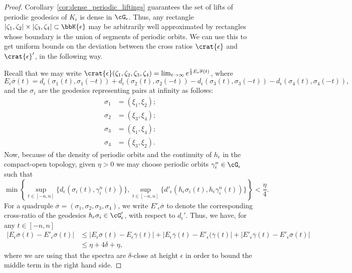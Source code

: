 \documentclass[reqno,11pt]{amsart}
\begin{document}
\begin{proof}
\par Corollary~\ref{cor:dense_periodic_liftings} guarantees the set of lifts of periodic geodesics of \(K_\epsilon\) is dense in \(\cG_\epsilon\).
Thus, any rectangle \(|\zeta_1, \zeta_2| \times |\zeta_3, \zeta_4| \subset \bbK{\epsilon}\) may be arbitrarily well approximated by rectangles whose boundary is the union of segments of periodic orbits.
We can use this to get uniform bounds on the deviation between the cross ratios \(\crat{\epsilon}\) and \(\crat{\epsilon}'\), in the following way.
\par Recall that we may write \(\crat{\epsilon}(\zeta_1, \zeta_2, \zeta_3, \zeta_4) = \lim_{t \to \infty} e^{\frac{1}{2}E_\epsilon\overline{\sigma}(t)}\), where
\[
    E_\epsilon\overline{\sigma}(t) = d_\epsilon(\sigma_1(t), \sigma_1(-t)) + d_\epsilon(\sigma_2(t), \sigma_2(-t)) - d_\epsilon(\sigma_3(t), \sigma_3(-t)) - d_\epsilon(\sigma_4(t), \sigma_4(-t)),
\]
and the \(\sigma_i\) are the geodesics representing pairs at infinity as follows:
\[
    \begin{split}
    \sigma_1 &= (\xi_1, \xi_2); \\
    \sigma_2 &= (\xi_3, \xi_4); \\
    \sigma_3 &= (\xi_1, \xi_4); \\
    \sigma_4 &= (\xi_3, \xi_2).
    \end{split}
\]
Now, because of the density of periodic orbits and the continuity of \(h_\epsilon\) in the compact-open topology, given \(\eta > 0\) we may choose periodic orbits \(\gamma^n_i \in \cG_\epsilon\) such that
\[
    \min\left\{\sup_{t \in [-n, n]}\{d_\epsilon(\sigma_i(t), \gamma^n_i(t))\}, \sup_{t \in [-n, n]}\{d'_\epsilon(h_\epsilon\sigma_i(t), h_\epsilon\gamma^n_i(t))\}\right\} < \frac{\eta}{4}.
\]
For a quadruple \(\overline\sigma = (\sigma_1, \sigma_2, \sigma_3, \sigma_4)\), we write \(E'_\epsilon\overline{\sigma}\) to denote the corresponding cross-ratio of the geodesics \(h_\epsilon\sigma_i \in \cG_\epsilon'\), with respect to \(d_\epsilon'\).
Thus, we have, for any \(t \in [-n, n]\)
\begin{align*}
    |E_\epsilon\overline{\sigma}(t) - E'_\epsilon\overline{\sigma}(t)| &\leq  |E_\epsilon\overline{\sigma}(t) - E_\epsilon\overline{\gamma}(t)| + |E_\epsilon\overline{\gamma}(t) - E'_\epsilon(\overline{\gamma}(t)| + |E'_\epsilon\overline{\gamma}(t) - E'_\epsilon\overline{\sigma}(t)|\\
    &\leq \eta + 4\delta + \eta,
\end{align*}
where we are using that the spectra are \(\delta\)-close at height \(\epsilon\) in order to bound the middle term in the right hand side.

\end{proof}
\end{document}
